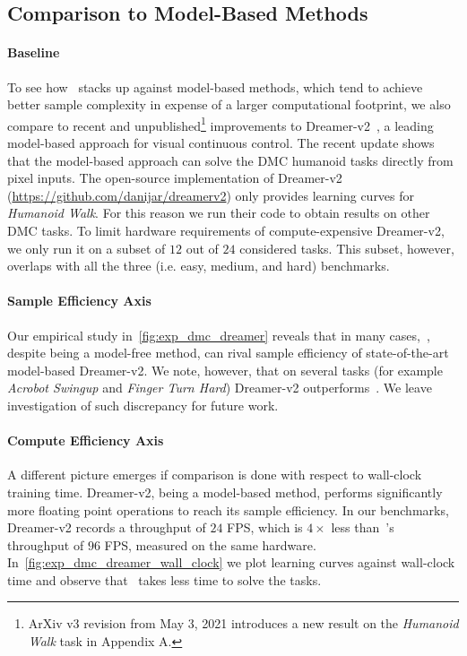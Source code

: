 \subsection{Comparison to Model-Based Methods}



\paragraph{Baseline}
To see how~\drqs{} stacks up against model-based methods, which tend to achieve better sample complexity in expense of a larger computational footprint, we also compare to recent and unpublished\footnote{ArXiv v3 revision from May 3, 2021 introduces a new result on the \textit{Humanoid Walk} task in Appendix A.} improvements to Dreamer-v2~\citep{hafner2020dreamerv2}, a leading model-based approach for visual continuous control. The recent update shows that the model-based approach can solve the DMC humanoid tasks directly from pixel inputs. The open-source implementation of Dreamer-v2 (\url{https://github.com/danijar/dreamerv2}) only provides learning curves for \textit{Humanoid Walk}. For this reason we run their code to obtain results on other DMC tasks. To limit hardware requirements of compute-expensive Dreamer-v2, we only run it on a subset of $12$ out of $24$ considered tasks. This subset, however, overlaps with all the three (i.e. easy, medium, and hard) benchmarks.

\paragraph{Sample Efficiency Axis}

Our empirical study in~\cref{fig:exp_dmc_dreamer} reveals that in many cases,~\drqs{}, despite being a model-free method, can rival sample efficiency of state-of-the-art model-based Dreamer-v2. We note, however, that on several tasks (for example \textit{Acrobot Swingup} and \textit{Finger Turn Hard}) Dreamer-v2 outperforms~\drqs{}. We leave investigation of such discrepancy for future work.

\paragraph{Compute Efficiency Axis} A different picture emerges if comparison is done with respect to wall-clock training time. Dreamer-v2, being a model-based method, performs  significantly more floating point operations to reach its sample efficiency. In our benchmarks, Dreamer-v2 records a throughput of $24$ FPS, which is $4\times$ less than~\drqs{}'s throughput of $96$ FPS, measured on the same hardware. In~\cref{fig:exp_dmc_dreamer_wall_clock} we plot learning curves against wall-clock time and observe that~\drqs{} takes less time to solve the tasks.



